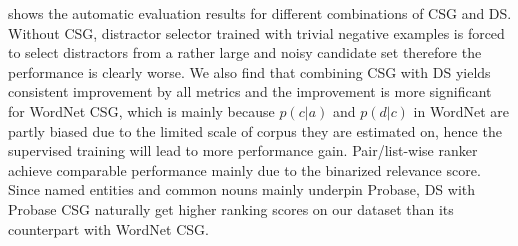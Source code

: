 
 shows the automatic evaluation results for different combinations of CSG and DS. Without CSG, distractor selector trained with trivial negative examples is forced to select distractors from a rather large and noisy candidate set therefore the performance is clearly worse. 
We also find that combining CSG with DS yields consistent improvement 
by all metrics and the improvement is more significant for WordNet CSG, 
which is mainly because $p(c|a)$ and $p(d|c)$ in WordNet are partly biased 
due to the limited scale of corpus they are estimated on, hence the 
supervised training will lead to more performance gain. Pair/list-wise ranker achieve comparable performance mainly due to the binarized relevance score.
Since named entities and common nouns mainly underpin Probase, 
DS with Probase CSG naturally get higher ranking scores on our dataset 
than its counterpart with WordNet CSG.

